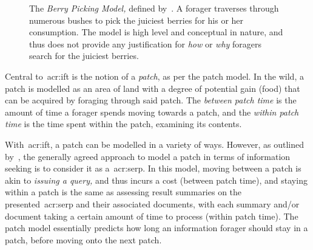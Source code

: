 \begin{figure}[t!]
    \centering
    \caption[The Berry Picking Model~\cite{bates1989berry_picking}]{The \emph{Berry Picking Model,} defined by~\cite{bates1989berry_picking}. A forager traverses through numerous bushes to pick the juiciest berries for his or her consumption. The model is high level and conceptual in nature, and thus does not provide any justification for \emph{how} or \emph{why} foragers search for the juiciest berries.}
    \label{fig:berry_picking}
\end{figure}

Central to~\gls{acr:ift} is the notion of a \emph{patch}, as per the patch model. In the wild, a patch is modelled as an area of land with a degree of potential gain (food) that can be acquired by foraging through said patch. The \emph{between patch time} is the amount of time a forager spends moving towards a patch, and the \emph{within patch time} is the time spent within the patch, examining its contents.

With~\gls{acr:ift}, a patch can be modelled in a variety of ways. However, as outlined by~\cite{azzopardi2015theories}, the generally agreed approach to model a patch in terms of information seeking is to consider it as a~\gls{acr:serp}. In this model, moving between a patch is akin to \emph{issuing a query,} and thus incurs a cost (between patch time), and staying within a patch is the same as assessing result summaries on the presented~\gls{acr:serp} and their associated documents, with each summary and/or document taking a certain amount of time to process (within patch time). The patch model essentially predicts how long an information forager should stay in a patch, before moving onto the next patch.


